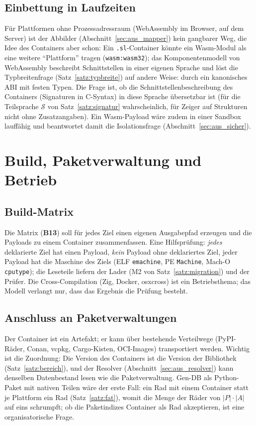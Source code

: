 \documentclass[a4paper,12pt,twoside]{report}
\DeclareRobustCommand{\_}{\ifmmode\mbox{\textunderscore}\else\textunderscore\allowbreak{}\fi}
\theoremstyle{definition}
\newcommand{\Bf}[1]{\textbf{B#1}}
\begin{document}
\subsection{Einbettung in Laufzeiten}
\label{sec:aus_wasm}
Für Plattformen ohne Prozessadressraum (WebAssembly im Browser, auf dem Server) ist der Abbilder (Abschnitt~\ref{sec:aus_mapper}) kein gangbarer Weg, die Idee des Containers aber schon: Ein \texttt{.sl}-Container könnte ein Wasm-Modul als eine weitere ``Plattform'' tragen (\texttt{wasm:wasm32}); das Komponentenmodell von WebAssembly beschreibt Schnittstellen in einer eigenen Sprache und löst die Typbreitenfrage (Satz~\ref{satz:typbreite}) auf andere Weise: durch ein kanonisches ABI mit festen Typen. Die Frage ist, ob die Schnittstellenbeschreibung des Containers (Signaturen in C-Syntax) in diese Sprache übersetzbar ist (für die Teilsprache $\mathcal S$ von Satz~\ref{satz:signatur} wahrscheinlich, für Zeiger auf Strukturen nicht ohne Zusatzangaben). Ein Wasm-Payload wäre zudem in einer Sandbox lauffähig und beantwortet damit die Isolationsfrage (Abschnitt~\ref{sec:aus_sicher}).

\section{Build, Paketverwaltung und Betrieb}

\subsection{Build-Matrix}
Die Matrix (\Bf{13}) soll für jedes Ziel einen eigenen Ausgabepfad erzeugen und die Payloads zu einem Container zusammenfassen. Eine Hilfsprüfung: \emph{jedes} deklarierte Ziel hat einen Payload, \emph{kein} Payload ohne deklariertes Ziel, jeder Payload hat die Maschine des Ziels (ELF \texttt{e\_machine}, PE \texttt{Machine}, Mach-O \texttt{cputype}); die Leseteile liefern der Lader (M2 von Satz~\ref{satz:migration}) und der Prüfer. Die Cross-Compilation (Zig, Docker, osxcross) ist ein Betriebsthema; das Modell verlangt nur, dass das Ergebnis die Prüfung besteht.

\subsection{Anschluss an Paketverwaltungen}
Der Container ist ein Artefakt; er kann über bestehende Verteilwege (PyPI-Räder, Conan, vcpkg, Cargo-Kisten, OCI-Images) transportiert werden. Wichtig ist die Zuordnung: Die Version des Containers ist die Version der Bibliothek (Satz~\ref{satz:bereich}), und der Resolver (Abschnitt~\ref{sec:aus_resolver}) kann denselben Datenbestand lesen wie die Paketverwaltung. Gen-DB als Python-Paket mit nativen Teilen wäre der erste Fall: ein Rad mit einem Container statt je Plattform ein Rad (Satz~\ref{satz:fat}), womit die Menge der Räder von $|P|\cdot|A|$ auf eins schrumpft; ob die Paketindizes Container als Rad akzeptieren, ist eine organisatorische Frage.
\end{document}
